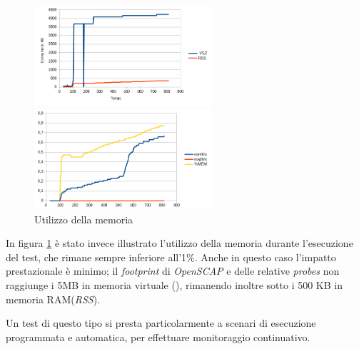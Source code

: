 \documentclass[../main.tex]{subfiles}
\begin{document}
\begin{figure}[H]
 \begin{minipage}[b]{6cm}
   \centering
   \includegraphics[width=6.6cm]{immagini/plot1mem.png}
 \end{minipage}
 \hspace{2mm} \hspace{3mm}
 \begin{minipage}[b]{9cm}
  \centering
   \includegraphics[width=6.6cm]{immagini/plot1mem2.png}
 \end{minipage}
 \caption{Utilizzo della memoria}\label{ref:plot1mem}
\end{figure}
In figura \ref{ref:plot1mem} è stato invece illustrato l'utilizzo della memoria durante l'esecuzione del test, che rimane sempre inferiore all'1\%. Anche in questo caso l'impatto prestazionale è minimo; il \textit{footprint} di \textit{OpenSCAP} e delle relative \textit{probes} non raggiunge i 5MB in memoria virtuale (), rimanendo inoltre sotto i 500 KB in memoria RAM(\textit{RSS}).

Un test di questo tipo si presta particolarmente a scenari di esecuzione programmata e automatica, per effettuare monitoraggio continuativo.
\end{document}
